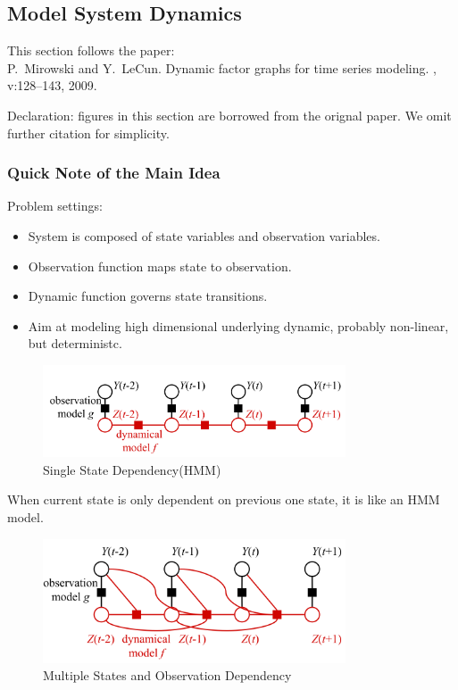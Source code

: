 \subsection{Model System Dynamics}
This section follows the paper:\\
P.~Mirowski and Y.~LeCun.
\newblock Dynamic factor graphs for time series modeling.
,
  v:128--143, 2009.
  
Declaration: figures in this section are borrowed from the orignal paper\cite{mirowski2009dynamic}. 
We omit further citation for simplicity.


\subsubsection{Quick Note of the Main Idea}

Problem settings:
\begin{itemize}
	\item System is composed of state variables and observation 
	variables. 
	\item Observation function maps state to observation. 
	\item Dynamic function governs state transitions. 
	\item Aim at modeling high dimensional underlying dynamic, 
	probably non-linear, but deterministc. 
\end{itemize}

\begin{figure}[htb]
\centering
	\includegraphics[width=0.8\textwidth]{fig/mirowski2009-HMM.png}
	\caption{Single State Dependency(HMM)}
\end{figure}	

When current state is only dependent on previous one state, it
is like an HMM model. 

\begin{figure}[htb]
\centering
	\includegraphics[width=0.8\textwidth]{fig/mirowski2009-framework.png}
	\caption{Multiple States and Observation Dependency}
\end{figure}

